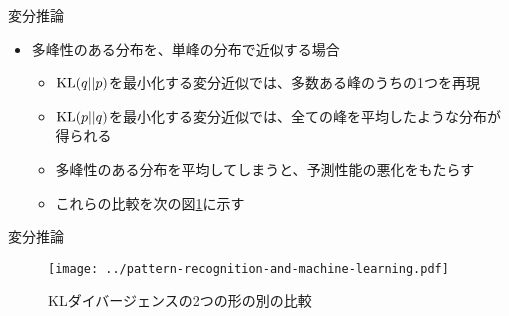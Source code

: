 \documentclass[dvipdfmx,notheorems,t]{beamer}
\begin{document}
\begin{frame}{変分推論}

\begin{itemize}
	\item 多峰性のある分布を、単峰の分布で近似する場合
	\begin{itemize}
		\item $\operatorname{KL}(q || p)$を最小化する変分近似では、\alert{多数ある峰のうちの1つ}を再現
		\item $\operatorname{KL}(p || q)$を最小化する変分近似では、\alert{全ての峰を平均したような分布}が得られる
		\newline
		\item 多峰性のある分布を平均してしまうと、\alert{予測性能の悪化}をもたらす
		\newline
		\item これらの比較を次の図\ref{fig:comparison-between-kl-divergence-2}に示す
	\end{itemize}
\end{itemize}

\end{frame}

\begin{frame}{変分推論}

\begin{figure}[h]
	\centering
	\texttt{[image: ../pattern-recognition-and-machine-learning.pdf]}
	\caption{KLダイバージェンスの2つの形の別の比較}
	\label{fig:comparison-between-kl-divergence-2}
\end{figure}

\end{frame}
\end{document}
